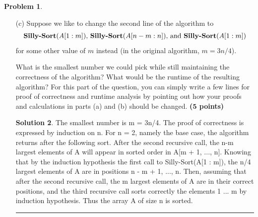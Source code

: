 \documentclass{article}
\theoremstyle{definition}
\newtheorem{problem}{Problem}
\def\fline{\rule{0.75\linewidth}{0.5pt}}
\newcommand{\finishline}{\begin{center}\fline\end{center}}
\newtheorem*{solution*}{Solution}
\newenvironment{solution}{\begin{solution*}}{{\finishline} \end{solution*}}
\newcommand{\grade}[1]{\hfill{\textbf{($\mathbf{#1}$ points)}}}
\begin{document}
\begin{problem}
\begin{enumerate}
\begin{solution}
\end{solution}

		\item [(c)] Suppose we like to change the second line of the algorithm to 
		\[
		\text{\textbf{Silly-Sort}$(A[1:m])$, \textbf{Silly-Sort}$(A[n-m:n])$, and \textbf{Silly-Sort}$(A[1:m])$}
		\]
		 for some other value of $m$ instead (in the original algorithm, $m = 3n/4$). 
		
		What is the smallest number we could pick while still maintaining the correctness of the algorithm? What would be the runtime of the resulting algorithm? 
		For this part of the question, you can simply write a few lines for proof of 
		correctness and runtime analysis by pointing out how your proofs and calculations in parts (a) and (b) should be changed. \grade{5}
		
	 \begin{solution}
	 	The smallest number is m = 3n/4. 
		The proof of correctness is expressed by induction on n. For n = 2, namely the base case, the algorithm returns after the following sort. After the second recursive call, the n-m largest elements of A will appear in sorted order in 		A[m + 1, ..., n]. Knowing that by the induction hypothesis the first call to Silly-Sort(A[1 : m]), the n/4 largest elements of A are in positions n - m + 1, ..., n. Then, assuming that after the second recursive call, the m largest 			elements of A are in their correct positions, and the third recursive call sorts correctly the elements 1 ... m by induction hypothesis. Thus the array A of size n is sorted.

	
\end{solution}

	\end{enumerate}
\end{problem}

\smallskip
\end{document}

